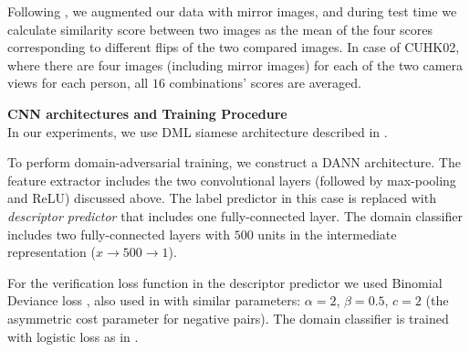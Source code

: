 \addtolength{\tabcolsep}{3pt}

Following \citet{Yi14}, we augmented our data with mirror images, and during test time we calculate similarity score between two images as the mean of the four scores corresponding to different flips of the two compared images. In case of CUHK02, where there are four images (including mirror images) for each of the two camera views for each person, all $16$ combinations' scores are averaged. 

\bigskip
\indent\textbf{CNN architectures and Training Procedure}\\
In our experiments, we use DML siamese architecture \citep{Yi14} described in . %

To perform domain-adversarial training, we construct a DANN architecture.  The feature extractor includes the two convolutional layers (followed by max-pooling and ReLU) discussed above. The label predictor in this case is replaced with \textit{descriptor predictor} that includes one fully-connected layer. The domain classifier includes two fully-connected layers with $500$ units in the intermediate representation ($x{\rightarrow}500{\rightarrow}1$). 

For the verification loss function in the descriptor predictor we used Binomial Deviance loss , also used in \citet{Yi14} with similar parameters: $\alpha = 2$, $\beta = 0.5$, $c = 2$ (the asymmetric cost parameter for negative pairs). The domain classifier is trained with logistic loss as in .

